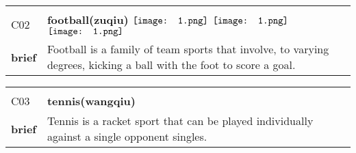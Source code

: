\documentclass[UTF8]{article}
\begin{document}
            \begin{tabularx}{\textwidth}{p{1.5cm}X}
            \arrayrulecolor{myBlue}
        	\hline\\
            \small{C02}&
            \large{\bfseries{football(zuqiu)}}\hfill
                                                            $\vcenter{\hbox{\texttt{[image: 1.png]}}}$
                                                                \phantom{$\vcenter{\hbox{\texttt{[image: 1.png]}}}$}
                                                                $\vcenter{\hbox{\texttt{[image: 1.png]}}}$
                                                                \phantom{$\vcenter{\hbox{\texttt{[image: 1.png]}}}$}
                                                                \phantom{$\vcenter{\hbox{\texttt{[image: 1.png]}}}$}
                                                                $\vcenter{\hbox{\texttt{[image: 1.png]}}}$
                                                                \phantom{$\vcenter{\hbox{\texttt{[image: 1.png]}}}$}
                                        \\[10pt]
            \large{\bfseries{brief}}&\noindent\parbox[c]{\hsize}{Football is a family of team sports that involve, to varying degrees, kicking a ball with the foot to score a goal. } \\[5pt]
            \hline\\[-10pt]
        \end{tabularx}
            \begin{tabularx}{\textwidth}{p{1.5cm}X}
            \arrayrulecolor{myBlue}
        	\hline\\
            \small{C03}&
            \large{\bfseries{tennis(wangqiu)}}\hfill
                                                            \phantom{$\vcenter{\hbox{\texttt{[image: 1.png]}}}$}
                                                                \phantom{$\vcenter{\hbox{\texttt{[image: 1.png]}}}$}
                                                                \phantom{$\vcenter{\hbox{\texttt{[image: 1.png]}}}$}
                                                                \phantom{$\vcenter{\hbox{\texttt{[image: 1.png]}}}$}
                                                                \phantom{$\vcenter{\hbox{\texttt{[image: 1.png]}}}$}
                                                                \phantom{$\vcenter{\hbox{\texttt{[image: 1.png]}}}$}
                                                                \phantom{$\vcenter{\hbox{\texttt{[image: 1.png]}}}$}
                                        \\[10pt]
            \large{\bfseries{brief}}&\noindent\parbox[c]{\hsize}{Tennis is a racket sport that can be played individually against a single opponent singles. } \\[5pt]
            \hline\\[-10pt]
        \end{tabularx}
\end{document}
